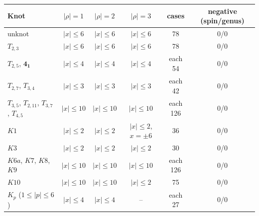 \begin{tabular}{lccccc}
\hline
Knot & $|\rho|=1$ & $|\rho|=2$ & $|\rho|=3$ & cases & negative (spin/genus) \\
\hline
unknot & $|x|\le6$ & $|x|\le6$ & $|x|\le6$ & 78 & 0/0 \\
$T_{2,3}$ & $|x|\le6$ & $|x|\le6$ & $|x|\le6$ & 78 & 0/0 \\
$T_{2,5}$, $\mathbf{4_1}$ & $|x|\le4$ & $|x|\le4$ & $|x|\le4$ & each 54 & 0/0 \\
$T_{2,7}$, $T_{3,4}$ & $|x|\le3$ & $|x|\le3$ & $|x|\le3$ & each 42 & 0/0 \\
$T_{3,5}$, $T_{2,11}$, $T_{3,7}$, $T_{4,5}$ & $|x|\le10$ & $|x|\le10$ & $|x|\le10$ & each 126 & 0/0 \\
$K1$ & $|x|\le2$ & $|x|\le2$ & $|x|\le2$, $x=\pm6$ & 36 & 0/0 \\
$K3$ & $|x|\le2$ & $|x|\le2$ & $|x|\le2$ & 30 & 0/0 \\
$K6a$, $K7$, $K8$, $K9$ & $|x|\le10$ & $|x|\le10$ & $|x|\le10$ & each 126 & 0/0 \\
$K10$ & $|x|\le10$ & $|x|\le10$ & $|x|\le2$ & 75 & 0/0 \\
$K_p$ ($1\le|p|\le6$) & $|x|\le4$ & $|x|\le4$ & -- & each 27 & 0/0 \\
\hline
\end{tabular}
